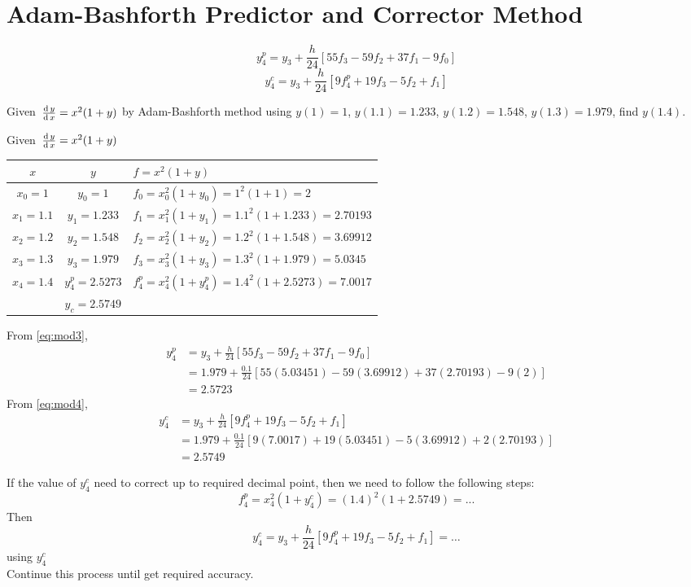 \documentclass[../main-sheet.tex]{subfiles}
\begin{document}
\section{Adam-Bashforth Predictor and Corrector Method}
\begin{equation}
    y_4^p=y_3+\frac{h}{24}\left[ 55f_3-59f_2+37f_1-9f_0 \right]\label{eq:mod3}
\end{equation}
\begin{equation}
    y_4^c=y_3+\frac{h}{24}\left[ 9f_4^p+19f_3-5f_2+f_1 \right]\label{eq:mod4}
\end{equation}
\begin{ex}
    Given \(\,\frac{\mathrm{d}\,y}{\mathrm{d}\,x}=x^2(1+y)\) by Adam-Bashforth method using \(y(1)=1\), \(y(1.1)=1.233\), \(y(1.2)=1.548\), \(y(1.3)=1.979 \), find \(y(1.4)\).
\end{ex}
\begin{soln}
    Given \(\,\frac{\mathrm{d}\,y}{\mathrm{d}\,x}=x^2(1+y)\)
    \begin{table}[H]
        \centering
        \begin{tabular}{ccl}
            \toprule 
            \(x\) & \(y\)&\(f=x^2(1+y)\)\\\midrule
            \(x_0=1\) & \(y_0=1\)&\(f_0=x_0^2(1+y_0)=1^2(1+1)=2\)\\
            \(x_1=1.1\) & \(y_1=1.233\)&\(f_1=x_1^2(1+y_1)=1.1^2(1+1.233)=2.70193\)\\
            \(x_2=1.2\) & \(y_2=1.548\)&\(f_2=x_2^2(1+y_2)=1.2^2(1+1.548)=3.69912\)\\
            \(x_3=1.3\) & \(y_3=1.979\)&\(f_3=x_3^2(1+y_3)=1.3^2(1+1.979)=5.0345\)\\
            \(x_4=1.4\) & \(y_4^p=2.5273\)&\(f_4^p=x_4^2(1+y_4^p)=1.4^2(1+2.5273)=7.0017\)\\
            & \(y_c=2.5749\)&\\\bottomrule
        \end{tabular}
    \end{table}
    From \eqref{eq:mod3},
    \begin{align*}
        y_4^p&=y_3+\frac{h}{24}[55f_3-59f_2+37f_1-9f_0]\\
        &=1.979+\frac{0.1}{24}[55(5.03451)-59(3.69912)+37(2.70193)-9(2)]\\
        &=2.5723
    \end{align*}
    From \eqref{eq:mod4},
    \begin{align*}
        y_4^c&=y_3+\frac{h}{24}[9f_4^p+19f_3-5f_2+f_1]\\
        &=1.979+\frac{0.1}{24}[9(7.0017)+19(5.03451)-5(3.69912)+2(2.70193)]\\
        &=2.5749
    \end{align*}
\end{soln}
\begin{note}
    If the value of \(y_4^c\) need to correct up to required decimal point, then we need to follow the following steps:
    \[f_4^p=x_4^2(1+y_4^c)=(1.4)^2(1+2.5749)=...\]
    Then
    \[y_4^c=y_3+\frac{h}{24}[9f_4^p+19f_3-5f_2+f_1]=\dots\]
    using \(y_4^c\)\\
    Continue this process until get required accuracy.
\end{note}
\end{document}
